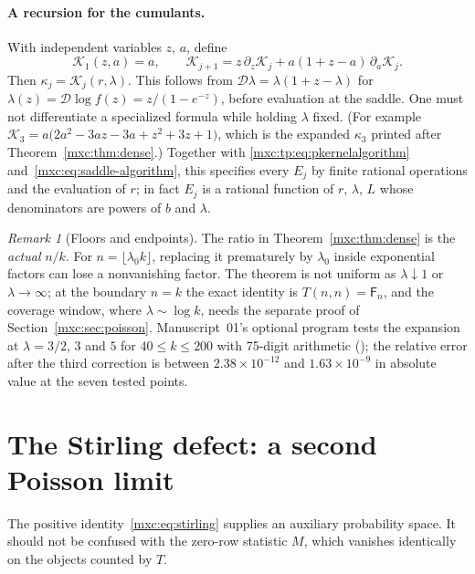 \documentclass[11pt]{article}
\numberwithin{equation}{section}
\theoremstyle{definition}
\theoremstyle{remark}
\newtheorem{remark}[theorem]{Remark}
\begin{document}
\paragraph{A recursion for the cumulants.} With independent variables
$z$, $a$, define
\begin{equation}\label{mxc:tp:eq:cumulantalgorithm}
 \mathcal K_1(z,a)=a,\qquad
 \mathcal K_{j+1}=z\,\partial_z\mathcal K_j+a(1+z-a)\,\partial_a\mathcal K_j.
\end{equation}
Then $\kappa_j=\mathcal K_j(r,\lambda)$. This follows from
$\mathcal D\lambda=\lambda(1+z-\lambda)$ for
$\lambda(z)=\mathcal D\log f(z)=z/(1-e^{-z})$, before evaluation at the
saddle. One must not differentiate a specialized formula while holding
$\lambda$ fixed. (For example
$\mathcal K_3=a\bigl(2a^2-3az-3a+z^2+3z+1\bigr)$, which is the expanded
$\kappa_3$ printed after Theorem~\ref{mxc:thm:dense}.) Together with
\eqref{mxc:tp:eq:pkernelalgorithm} and~\eqref{mxc:eq:saddle-algorithm},
this specifies every $E_j$ by finite rational operations and the
evaluation of $r$; in fact $E_j$ is a rational function of $r$,
$\lambda$, $L$ whose denominators are powers of $b$ and $\lambda$.

\begin{remark}[Floors and endpoints]\label{mxc:tp:rem:floors}
The ratio in Theorem~\ref{mxc:thm:dense} is the \emph{actual} $n/k$. For
$n=\lfloor\lambda_0k\rfloor$, replacing it prematurely by $\lambda_0$
inside exponential factors can lose a nonvanishing factor. The theorem is
not uniform as $\lambda\downarrow1$ or $\lambda\to\infty$; at the
boundary $n=k$ the exact identity is $T(n,n)=\mathsf F_n$, and the
coverage window, where $\lambda\sim\log k$, needs the separate proof of
Section~\ref{mxc:sec:poisson}. Manuscript~01's optional program
 tests the expansion at
$\lambda=3/2$, $3$ and $5$ for $40\le k\le200$ with 75-digit arithmetic
(); the relative error after
the third correction is between $2.38\times10^{-12}$ and
$1.63\times10^{-9}$ in absolute value at the seven tested points.
\end{remark}

\section{The Stirling defect: a second Poisson limit}\label{mxc:tp:sec:defect}

The positive identity~\eqref{mxc:eq:stirling} supplies an auxiliary
probability space. It should not be confused with the zero-row
statistic $M$, which vanishes identically on the objects counted by $T$.
\end{document}
